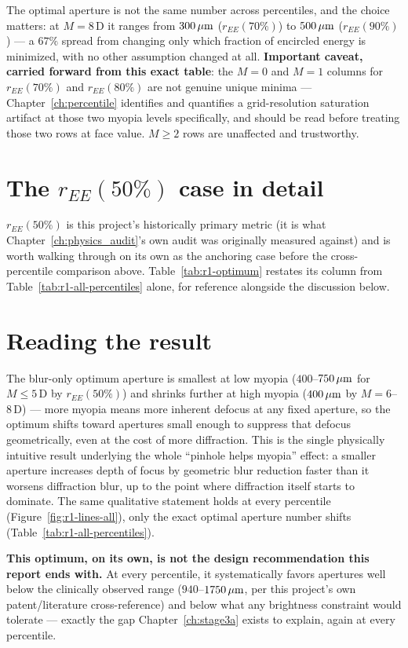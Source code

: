 

The optimal aperture is not the same number across percentiles, and the choice
matters: at $M=8\,$D it ranges from $300\,\mu\text{m}$ ($r_{EE}(70\%)$) to $500\,\mu\text{m}$
($r_{EE}(90\%)$) --- a $67\%$ spread from changing only which fraction of encircled
energy is minimized, with no other assumption changed at all.
\textbf{Important caveat, carried forward from this exact table}: the $M=0$ and
$M=1$ columns for $r_{EE}(70\%)$ and $r_{EE}(80\%)$ are not genuine unique minima ---
Chapter~\ref{ch:percentile} identifies and quantifies a grid-resolution saturation
artifact at those two myopia levels specifically, and should be read before treating
those two rows at face value. $M\ge2$ rows are unaffected and trustworthy.

\section{The $r_{EE}(50\%)$ case in detail}

$r_{EE}(50\%)$ is this project's historically primary metric (it is what
Chapter~\ref{ch:physics_audit}'s own audit was originally measured against) and is
worth walking through on its own as the anchoring case before the cross-percentile
comparison above. Table~\ref{tab:r1-optimum} restates its column from
Table~\ref{tab:r1-all-percentiles} alone, for reference alongside the discussion below.



\section{Reading the result}

The blur-only optimum aperture is smallest at low myopia ($400$--$750\,\mu\text{m}$ for
$M\le5\,$D by $r_{EE}(50\%)$) and shrinks further at high myopia ($400\,\mu\text{m}$ by
$M=6$--$8\,$D) --- more myopia means more inherent defocus at any fixed aperture, so
the optimum shifts toward apertures small enough to suppress that defocus
geometrically, even at the cost of more diffraction. This is the single physically
intuitive result underlying the whole ``pinhole helps myopia'' effect: a smaller
aperture increases depth of focus by geometric blur reduction faster than it worsens
diffraction blur, up to the point where diffraction itself starts to dominate. The
same qualitative statement holds at every percentile (Figure~\ref{fig:r1-lines-all}),
only the exact optimal aperture number shifts (Table~\ref{tab:r1-all-percentiles}).

\textbf{This optimum, on its own, is not the design recommendation this report ends
with.} At every percentile, it systematically favors apertures well below the
clinically observed range ($940$--$1750\,\mu\text{m}$, per this project's own patent/literature
cross-reference) and below what any brightness constraint would tolerate --- exactly
the gap Chapter~\ref{ch:stage3a} exists to explain, again at every percentile.

